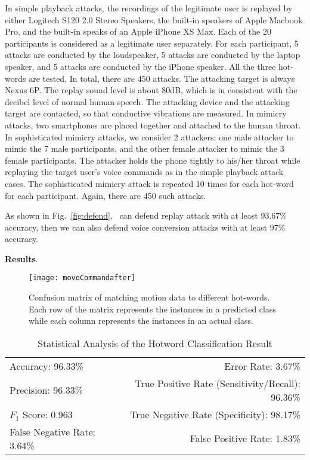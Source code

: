 In simple playback attacks, the recordings of the legitimate user is replayed by either Logitech S120 2.0 Stereo Speakers, the built-in speakers of Apple Macbook Pro, and the built-in speaks of an Apple iPhone XS Max. Each of the 20 participants is considered as a legitimate user separately. For each participant, 5 attacks are conducted by the loudspeaker, 5 attacks are conducted by the laptop speaker, and 5 attacks are conducted by the iPhone speaker. All the three hot-words are tested. In total, there are 450 attacks. The attacking target is always Nexus 6P. The replay sound level is about 80dB, which is in consistent with the decibel level of normal human speech. 
The attacking device and the attacking target  are contacted, so that conductive vibrations are measured. In mimicry attacks, two smartphones are placed together and attached to the human throat. In sophisticated mimicry attacks, we consider 2 attackers: one male attacker to mimic the 7 male participants, and the other female attacker to mimic the 3 female participants. The attacker holds the phone tightly to his/her throat while replaying the target user's voice commands as in the simple playback attack cases. The sophisticated mimicry attack is repeated 10 times for each hot-word for each participant. Again, there are 450 such attacks.

As shown in Fig.~\ref{fig:defend}, \shortname~can defend replay attack with at least 93.67\% accuracy, then we can also defend  voice conversion attacks with at least 97\% accuracy.











\textbf{Results}.
\begin{figure}[h]
	\centering
	\texttt{[image: movoCommandafter]}
	\caption[Confusion Matrix of Matching Motion Data to Different Hot-Words. ]{Confusion matrix of matching motion data to different hot-words. Each row of the matrix represents the instances in a predicted class while each column represents the instances in an actual class.}
	\label{fig:commadmat}
\end{figure}
\begin{table}[t]
	\caption{Statistical Analysis of the Hotword Classification Result}
	\label{tab:commandTable}
	\centering
	\begin{tabular}{lr}
		\toprule
		Accuracy: 96.33\% & \hspace{-.55in} Error Rate: 3.67\% \\
		Precision: 96.33\% & \hspace{-.55in} True Positive Rate (Sensitivity/Recall): 96.36\% \\
		$F_1$ Score: 0.963 & \hspace{-.55in} True Negative Rate (Specificity): 98.17\% \\
		False Negative Rate: 3.64\%  & \hspace{-.55in} False Positive Rate: 1.83\% \\
		\bottomrule
	\end{tabular}
\end{table}

